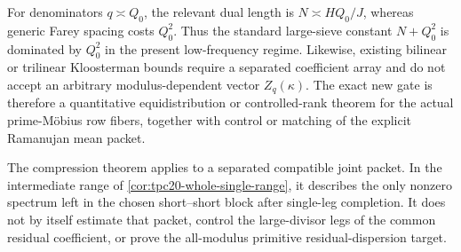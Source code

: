 \begin{remark}
\label{rem:tpc20-generic-large-sieve-nogo}
For denominators \(q\asymp Q_0\), the relevant dual length is
\(N\asymp HQ_0/J\), whereas generic Farey spacing costs \(Q_0^2\).
Thus the standard large-sieve constant \(N+Q_0^2\) is dominated by
\(Q_0^2\) in the present low-frequency regime.  Likewise, existing
bilinear or trilinear Kloosterman bounds require a separated coefficient
array and do not accept an arbitrary modulus-dependent vector
\(Z_q(\kappa)\).  The exact new gate is therefore a quantitative
equidistribution or controlled-rank theorem for the actual
prime-M\"obius row fibers, together with control or matching of the
explicit Ramanujan mean packet.
\end{remark}

\begin{remark}
\label{rem:tpc20-fiber-scope}
The compression theorem applies to a separated compatible joint packet.
In the intermediate range of
\cref{cor:tpc20-whole-single-range}, it describes the only nonzero
spectrum left in the chosen short--short block after single-leg
completion.  It does not by itself estimate that packet, control the
large-divisor legs of the common residual coefficient, or prove the
all-modulus primitive residual-dispersion target.
\end{remark}

